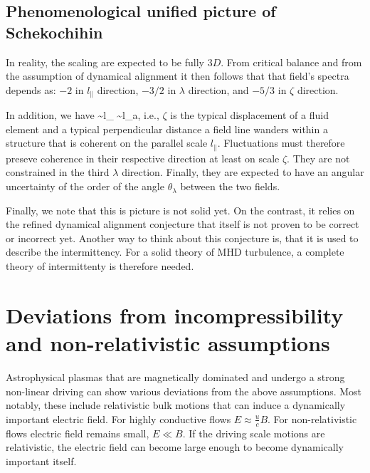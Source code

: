 \documentclass[usenatbib,twocolumn]{aastex63}
\begin{document}
\subsection{Phenomenological unified picture of Schekochihin}

In reality, the scaling are expected to be fully $3D$.
From critical balance and from the assumption of dynamical alignment it then follows that that field's spectra depends as:
$-2$ in $l_\parallel$ direction,
$-3/2$ in $\lambda$ direction, and
$-5/3$ in $\zeta$ direction.

In addition, we have
\be
\zeta \sim l_\parallel {} \sim l_\parallel {}a,
\ee
i.e., $\zeta$ is the typical displacement of a fluid element and a typical perpendicular distance a field line wanders within a structure that is coherent on the parallel scale $l_\parallel$.
Fluctuations must therefore preseve coherence in their respective direction at least on scale $\zeta$.
They are not constrained in the third $\lambda$ direction.
Finally, they are expected to have an angular uncertainty of the order of the angle $\theta_\lambda$ between the two fields.

Finally, we note that this is picture is not solid yet.
On the contrast, it relies on the refined dynamical alignment conjecture that itself is not proven to be correct or incorrect yet.
Another way to think about this conjecture is, that it is used to describe the intermittency.
For a solid theory of MHD turbulence, a complete theory of intermittenty is therefore needed.



\section{Deviations from incompressibility and non-relativistic assumptions}\label{sect:kin_theory}


Astrophysical plasmas that are magnetically dominated and undergo a strong non-linear driving can show various deviations from the above assumptions.
Most notably, these include relativistic bulk motions that can induce a dynamically important electric field.
For highly conductive flows $E \approx \frac{u}{c} B$.
For non-relativistic flows electric field remains small, $E \ll B$.
If the driving scale motions are relativistic, the electric field can become large enough to become dynamically important itself.
\end{document}
